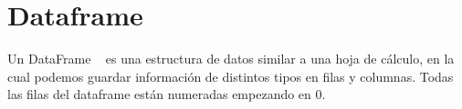 \section{Dataframe}
Un DataFrame ~\cite{wiki:dataframe} es una estructura de datos similar a una hoja de cálculo, en la cual podemos guardar información de distintos tipos en filas y columnas. Todas las filas del dataframe están numeradas empezando en 0.